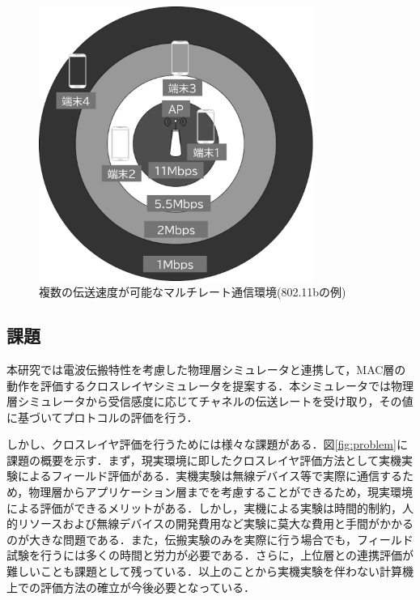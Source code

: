 \documentclass[a4paper,10pt]{ltjsarticle}
\begin{document}
\begin{figure}[H]
  \centering
  \includegraphics[width=0.8\textwidth]{./assets/multilate.png}
  \caption{複数の伝送速度が可能なマルチレート通信環境(802.11bの例)}
  \label{multirate}
\end{figure}

\clearpage

\subsection{課題}
本研究では電波伝搬特性を考慮した物理層シミュレータと連携して，MAC層の動作を評価するクロスレイヤシミュレータを提案する．本シミュレータでは物理層シミュレータから受信感度に応じてチャネルの伝送レートを受け取り，その値に基づいてプロトコルの評価を行う．

しかし、クロスレイヤ評価を行うためには様々な課題がある．図\ref{fig:problem}に課題の概要を示す．まず，現実環境に即したクロスレイヤ評価方法として実機実験によるフィールド評価がある．実機実験は無線デバイス等で実際に通信するため，物理層からアプリケーション層までを考慮することができるため，現実環境による評価ができるメリットがある．しかし，実機による実験は時間的制約，人的リソースおよび無線デバイスの開発費用など実験に莫大な費用と手間がかかるのが大きな問題である．また，伝搬実験のみを実際に行う場合でも，フィールド試験を行うには多くの時間と労力が必要である．さらに，上位層との連携評価が難しいことも課題として残っている．以上のことから実機実験を伴わない計算機上での評価方法の確立が今後必要となっている\cite{book2}．
\end{document}

